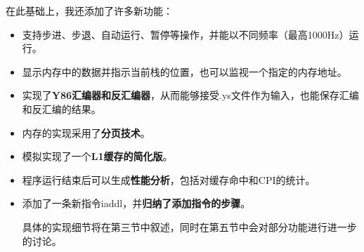 在此基础上，我还添加了许多新功能：
\begin{itemize}
\item 支持步进、步退、自动运行、暂停等操作，并能以不同频率（最高1000Hz）运行。
\item 显示内存中的数据并指示当前栈的位置，也可以监视一个指定的内存地址。
\item 实现了{\bf Y86汇编器和反汇编器}，从而能够接受.ys文件作为输入，也能保存汇编和反汇编的结果。
\item 内存的实现采用了{\bf 分页技术}。
\item 模拟实现了一个{\bf L1缓存的简化版}。
\item 程序运行结束后可以生成{\bf 性能分析}，包括对缓存命中和CPI的统计。
\item 添加了一条新指令iaddl，并{\bf 归纳了添加指令的步骤}。

具体的实现细节将在第三节中叙述，同时在第五节中会对部分功能进行进一步的讨论。

\end{itemize}
